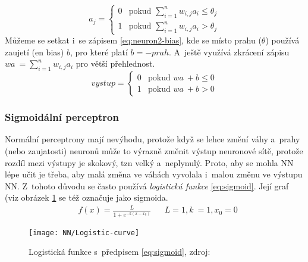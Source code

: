 \documentclass[12pt,oneside]{report}			%
\begin{document}
	\begin{equation}
	\label{eq:neuron2}
	a_j = 
		\begin{cases}
		0 & \text{pokud $\sum_{i=1}^{n} w_{i,j} a_i \leq \theta_{j}$}\\
		1 & \text{pokud $\sum_{i=1}^{n} w_{i,j} a_i > \theta_{j}$}
		\end{cases}
	\end{equation}
	Můžeme se setkat i~se zápisem \eqref{eq:neuron2-bias}, kde se místo prahu ($\theta$) používá zaujetí (\gls{en} bias) $b$, pro které platí $b = - prah$. A~ještě využívá zkrácení zápisu $ w a~= \sum_{i=1}^{n} w_{i,j} a_i $ pro větší přehlednost.\parencite[\gls{k} 1.1]{NN-Nielsen-web}
	\begin{equation}
	\label{eq:neuron2-bias}
	vystup = 
		\begin{cases}
		0 & \text{pokud $w a~+ b \leq 0$}\\
		1 & \text{pokud $w a~+ b > 0$}
		\end{cases}
	\end{equation}
	
	\subsubsection{Sigmoidální perceptron}
	\label{sec:Sigmoid-perceptron}
	Normální perceptrony mají nevýhodu, protože když se lehce změní váhy a~prahy (nebo zaujatosti) neuronů může to výrazně změnit výstup neuronové sítě, protože rozdíl mezi výstupy je skokový, \gls{tzn} velký a~neplynulý. Proto, aby se mohla \gls{NN} lépe učit je třeba, aby malá změna ve váhách vyvolala i~malou změnu ve výstupu \gls{NN}. Z~tohoto důvodu se často používá \emph{logistická funkce} \eqref{eq:sigmoid}. Její graf (\gls{viz} obrázek \ref{fig:sigmoid} se též označuje jako sigmoida. \parencite[\gls{k} 1.2]{NN-Nielsen-web}
	\begin{align}
	\label{eq:sigmoid}
	&f(x) = \frac{L}{1 + e^{-k (x - x_0)}} && L = 1, k~= 1, x_0 = 0
	\end{align}
	\begin{figure}
	\texttt{[image: NN/Logistic-curve]}
	\centering
	\caption{Logistická funkce s~předpisem \eqref{eq:sigmoid}, zdroj: \parencite{wiki_logistic_function}}
	\label{fig:sigmoid}
	\end{figure}
	
\end{document}

